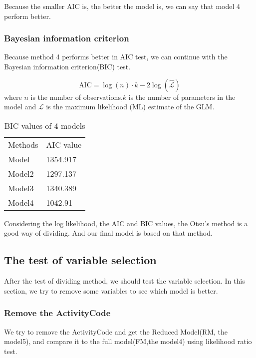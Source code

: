 \documentclass[11pt]{article}
\begin{document}
Because the smaller AIC is, the better the model is, we can say that model 4 perform better.


\subsubsection{Bayesian information criterion}

Because method 4 performs better in AIC test, we can continue with the Bayesian information criterion(BIC) test.

\begin{equation}
	\text{AIC}=\log(n)\cdot k-2\log(\hat{\mathcal{L}})
\end{equation}
where $n$ is the number of observations,$k$ is the number of parameters in the model and $\mathcal{L} $ is the maximum likelihood (ML) estimate of the GLM.

\begin{table}[!htbp]
\centering
\begin{tabular}{ll}
\rowcolor[HTML]{9B9B9B} 
{\color[HTML]{FFFFFF} Methods} & {\color[HTML]{FFFFFF} AIC value} \\
Model & 1354.917\\
\rowcolor[HTML]{EFEFEF} 
Model2 & 1297.137\\
Model3& 1340.389\\
\rowcolor[HTML]{EFEFEF}
Model4 & 1042.91
\end{tabular}
\caption{BIC values of 4 models}
\label{Table3}                
\end{table}

Considering the log likelihood, the AIC and BIC values, the Otsu's method is a good way of dividing. And our final model is based on that method.


\subsection{The test of variable selection}

After the test of dividing method, we should test the variable selection. In this section, we try to remove some variables to see which model is better.

\subsubsection{Remove the ActivityCode}

We try to remove the ActivityCode and get the Reduced Model(RM, the model5), and compare it to the full model(FM,the model4) using likelihood ratio test.
\end{document}
